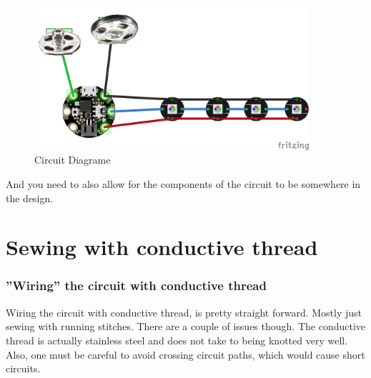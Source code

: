 \documentclass[letterpaper,twoside,12pt]{article}
\begin{document}
\clearpage
\begin{figure}[hbpt]\begin{centering}%
\includegraphics[width=4in]{CircuitDiagram_bb.png}
\caption{Circuit Diagrame}
\label{fig:circuitdiagrame}
\end{centering}\end{figure}
And you need to also allow for the components of the circuit to be somewhere 
in the design.
\part{Sewing with conductive thread}
\section{''Wiring'' the circuit with conductive thread}
Wiring the circuit with conductive thread, is pretty straight forward.  Mostly 
just sewing with running stitches.  There are a couple of issues though.  The 
conductive thread is actually stainless steel and does not take to being 
knotted very well.  Also, one must be careful to avoid crossing circuit paths, 
which would cause short circuits.
\end{document}
